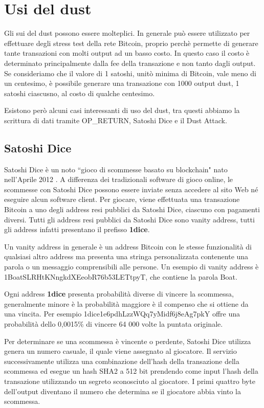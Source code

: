 \section{Usi del dust}
Gli sui del dust possono essere molteplici. In generale può essere utilizzato per effettuare degli stress test della rete Bitcoin, proprio perchè permette di generare tante transazioni con molti output ad un basso costo. In questo caso il costo è determinato principalmente dalla fee della transazione e non tanto dagli output. Se consideriamo che il valore di 1 satoshi, unitò minima di Bitcoin, vale meno di un centesimo, è possibile generare una transazione con 1000 output dust, 1 satoshi ciascusno, al costo di qualche centesimo.

Esistono però alcuni casi interessanti di uso del dust, tra questi abbiamo la scrittura di dati tramite OP\_RETURN, Satoshi Dice e il Dust Attack.
\subsection{Satoshi Dice}
Satoshi Dice è un noto ``gioco di scommesse basato su blockchain" nato nell'Aprile 2012 \cite{SD}. A differenza dei tradizionali software di gioco online, le scommesse con Satoshi Dice possono essere inviate senza accedere al sito Web né eseguire alcun software client. Per giocare, viene effettuata una transazione Bitcoin a uno degli address resi pubblici da Satoshi Dice, ciascuno con pagamenti diversi. Tutti gli address resi pubblici da Satoshi Dice sono vanity address, tutti gli address infatti presentano il prefisso \textbf{1dice}.

Un vanity address in generale è un address Bitcoin con le stesse funzionalità di qualsiasi altro address ma presenta una stringa personalizzata contenente una parola o un messaggio comprensibili alle persone. Un esempio di vanity address è 1BoatSLRHtKNngkdXEeobR76b53LETtpyT, che contiene la parola Boat. 

Ogni address \textbf{1dice} presenta probabilità diverse di vincere la scommessa, generalmente minore è la probabilità maggiore è il compenso che si ottiene da una vincita. Per esempio 1dice1e6pdhLzzWQq7yMidf6j8eAg7pkY offre una probabilità dello 0,0015\% di vincere 64 000 volte la puntata originale.

Per determinare se una scommessa è vincente o perdente, Satoshi Dice utilizza genera un numero casuale, il quale viene assegnato al giocatore. Il servizio successivamente utilizza una combinazione dell'hash della transazione della scommessa ed esegue un hash SHA2 a 512 bit prendendo come input l'hash della transazione utilizzando un segreto sconosciuto al giocatore. I primi quattro byte dell'output diventano il numero che determina se il giocatore abbia vinto la scommessa.

